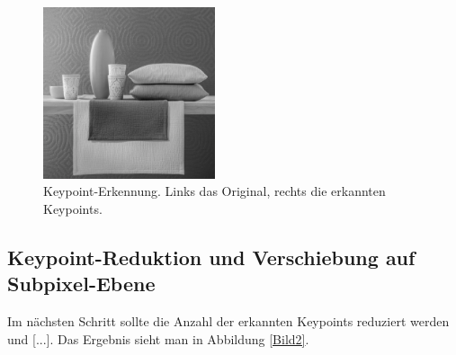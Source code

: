 \documentclass[a4paper,12pt]{scrartcl}
\begin{document}
\begin{figure}[htbp]
  \centering
  \includegraphics[width=0.45\textwidth]{bild}
  \caption{Keypoint-Erkennung. Links das Original, rechts die erkannten Keypoints.}
  \label{Bild1}
\end{figure}

\subsection{Keypoint-Reduktion und Verschiebung auf Subpixel-Ebene}
Im nächsten Schritt sollte die Anzahl der erkannten Keypoints reduziert werden und [...].
Das Ergebnis sieht man in Abbildung \ref{Bild2}.

% 
% 
% 
% 
% 
% 
% 
% 
% 
% 
% 
% 
\end{document}
